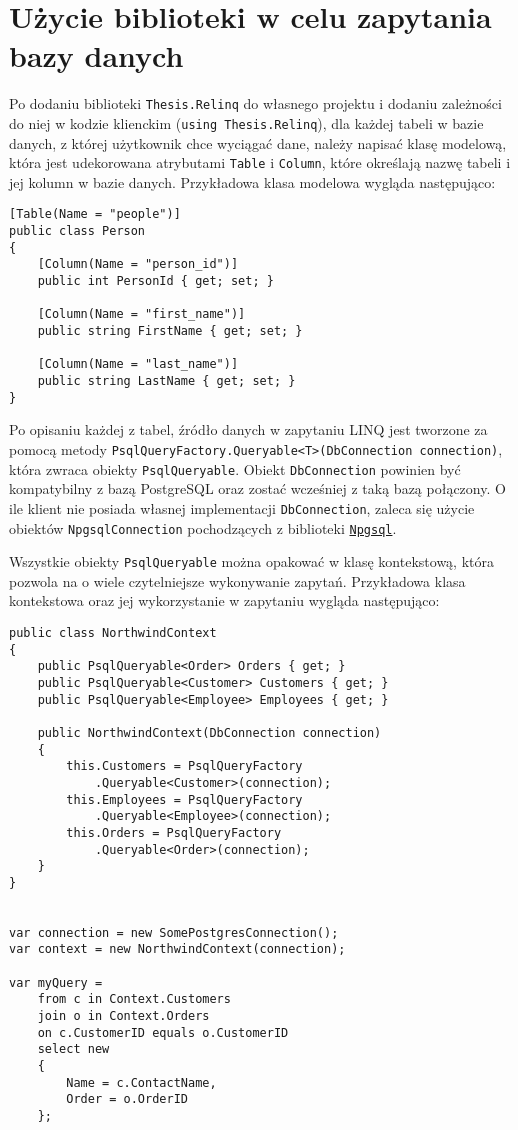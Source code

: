 \chapter{Użycie biblioteki w celu zapytania bazy danych}
Po dodaniu biblioteki \texttt{Thesis.Relinq} do własnego projektu i dodaniu zależności do niej w kodzie klienckim (\texttt{using Thesis.Relinq}), dla każdej tabeli w bazie danych, z której użytkownik chce wyciągać dane, należy napisać klasę modelową, która jest udekorowana atrybutami \texttt{Table} i \texttt{Column}, które określają nazwę tabeli i jej kolumn w bazie danych. Przykładowa klasa modelowa wygląda następująco:

\begin{lstlisting}
[Table(Name = "people")]
public class Person
{
    [Column(Name = "person_id")]
    public int PersonId { get; set; }

    [Column(Name = "first_name")]
    public string FirstName { get; set; }

    [Column(Name = "last_name")]
    public string LastName { get; set; }
}
\end{lstlisting}

Po opisaniu każdej z tabel, źródło danych w zapytaniu LINQ jest tworzone za pomocą metody \texttt{PsqlQueryFactory.Queryable<T>(DbConnection connection)}, która zwraca obiekty \texttt{PsqlQueryable}. Obiekt \texttt{DbConnection} powinien być kompatybilny z bazą PostgreSQL oraz zostać wcześniej z taką bazą połączony. O ile klient nie posiada własnej implementacji \texttt{DbConnection}, zaleca się użycie obiektów \texttt{NpgsqlConnection} pochodzących z biblioteki \href{http://www.npgsql.org/}{\texttt{Npgsql}}.

Wszystkie obiekty \texttt{PsqlQueryable} można opakować w klasę kontekstową, która pozwola na o wiele czytelniejsze wykonywanie zapytań. Przykładowa klasa kontekstowa oraz jej wykorzystanie w zapytaniu wygląda następująco:

\begin{lstlisting}
public class NorthwindContext
{
    public PsqlQueryable<Order> Orders { get; }
    public PsqlQueryable<Customer> Customers { get; }
    public PsqlQueryable<Employee> Employees { get; }

    public NorthwindContext(DbConnection connection)
    {
        this.Customers = PsqlQueryFactory
            .Queryable<Customer>(connection);
        this.Employees = PsqlQueryFactory
            .Queryable<Employee>(connection);
        this.Orders = PsqlQueryFactory
            .Queryable<Order>(connection);
    }
}


var connection = new SomePostgresConnection();
var context = new NorthwindContext(connection);

var myQuery =
    from c in Context.Customers
    join o in Context.Orders
    on c.CustomerID equals o.CustomerID
    select new
    {
        Name = c.ContactName,
        Order = o.OrderID
    };
\end{lstlisting}
